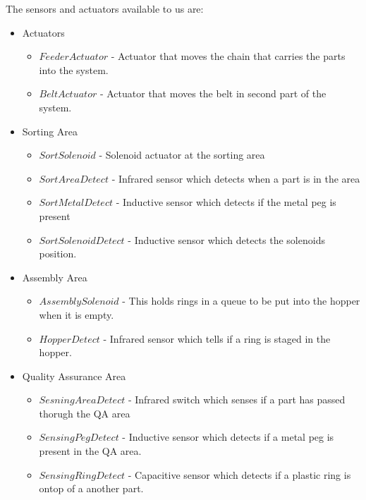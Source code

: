 \documentclass[12pt]{article}
\begin{document}
The sensors and actuators available to us are:
  \begin{itemize}
    \item Actuators
      \begin{itemize}
        \item $FeederActuator$ - Actuator that moves the chain that carries the parts into the system.
        \item $BeltActuator$ - Actuator that moves the belt in second part of the system.
      \end{itemize}
    \item Sorting Area
      \begin{itemize}
        \item $SortSolenoid$ - Solenoid actuator at the sorting area
        \item $SortAreaDetect$ - Infrared sensor which detects when a part is in the area
        \item $SortMetalDetect$ - Inductive sensor which detects if the metal peg is present
        \item $SortSolenoidDetect$ - Inductive sensor which detects the solenoids po\-sition.
      \end{itemize}
    \item Assembly Area
      \begin{itemize}
        \item $AssemblySolenoid$ - This holds rings in a queue to be put into the hopper when it is empty.
        \item $HopperDetect$ - Infrared sensor which tells if a ring is staged in the hopper.
      \end{itemize}
    \item Quality Assurance Area
      \begin{itemize}
        \item $SesningAreaDetect$ - Infrared switch which senses if a part has passed thorugh the QA area
        \item $SensingPegDetect$ - Inductive sensor which detects if a metal peg is present in the QA area.
        \item $SensingRingDetect$ - Capacitive sensor which detects if a plastic ring is ontop of a another part.
      \end{itemize}
  \end{itemize}
\end{document}
